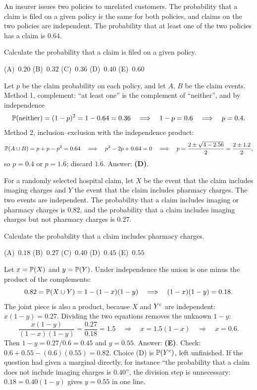 \begin{example}
An insurer issues two policies to unrelated customers. The probability that a claim is filed on a given policy is the same for both policies, and claims on the two policies are independent. The probability that at least one of the two policies has a claim is $0.64$.

Calculate the probability that a claim is filed on a given policy.

\begin{center}
(A)~$0.20$ \quad (B)~$0.32$ \quad (C)~$0.36$ \quad (D)~$0.40$ \quad (E)~$0.60$
\end{center}
\end{example}
\begin{solution}
Let $p$ be the claim probability on each policy, and let $A$, $B$ be the claim events. Method 1, complement: ``at least one'' is the complement of ``neither'', and by independence
\[
\mathbb{P}(\text{neither}) = (1-p)^2 = 1 - 0.64 = 0.36 \quad\Longrightarrow\quad 1 - p = 0.6 \quad\Longrightarrow\quad p = 0.4.
\]
Method 2, inclusion--exclusion with the independence product:
\[
\mathbb{P}(A \cup B) = p + p - p^2 = 0.64 \quad\Longrightarrow\quad p^2 - 2p + 0.64 = 0 \quad\Longrightarrow\quad p = \frac{2 \pm \sqrt{4 - 2.56}}{2} = \frac{2 \pm 1.2}{2},
\]
so $p = 0.4$ or $p = 1.6$; discard $1.6$. Answer: \textbf{(D)}.
\end{solution}

\begin{example}
For a randomly selected hospital claim, let $X$ be the event that the claim includes imaging charges and $Y$ the event that the claim includes pharmacy charges. The two events are independent. The probability that a claim includes imaging or pharmacy charges is $0.82$, and the probability that a claim includes imaging charges but not pharmacy charges is $0.27$.

Calculate the probability that a claim includes pharmacy charges.

\begin{center}
(A)~$0.18$ \quad (B)~$0.27$ \quad (C)~$0.40$ \quad (D)~$0.45$ \quad (E)~$0.55$
\end{center}
\end{example}
\begin{solution}
Let $x = \mathbb{P}(X)$ and $y = \mathbb{P}(Y)$. Under independence the union is one minus the product of the complements:
\[
0.82 = \mathbb{P}(X \cup Y) = 1 - (1-x)(1-y) \quad\Longrightarrow\quad (1-x)(1-y) = 0.18.
\]
The joint piece is also a product, because $X$ and $Y^{\mathrm{c}}$ are independent: $x(1-y) = 0.27$. Dividing the two equations removes the unknown $1 - y$:
\[
\frac{x(1-y)}{(1-x)(1-y)} = \frac{0.27}{0.18} = 1.5 \quad\Longrightarrow\quad x = 1.5(1-x) \quad\Longrightarrow\quad x = 0.6.
\]
Then $1 - y = 0.27/0.6 = 0.45$ and $y = 0.55$. Answer: \textbf{(E)}. Check: $0.6 + 0.55 - (0.6)(0.55) = 0.82$. Choice (D) is $\mathbb{P}(Y^{\mathrm{c}})$, left unfinished. If the question had given a marginal directly, for instance ``the probability that a claim does not include imaging charges is $0.40$'', the division step is unnecessary: $0.18 = 0.40(1-y)$ gives $y = 0.55$ in one line.
\end{solution}

